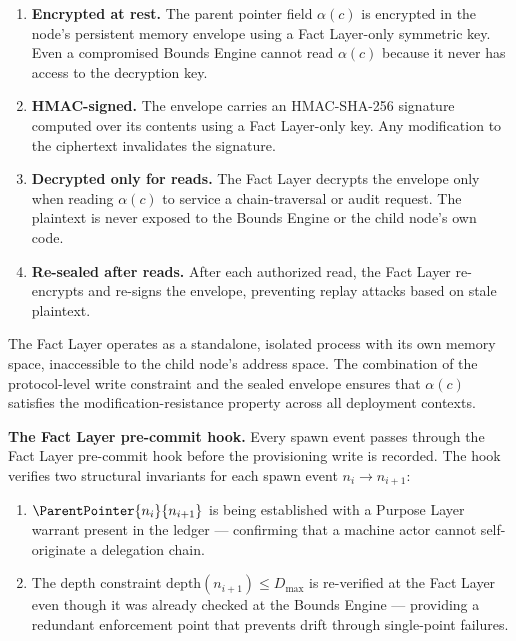 \begin{enumerate}
    \item \textbf{Encrypted at rest.} The parent pointer field $\alpha(c)$ is encrypted in the node's persistent memory envelope using a Fact Layer-only symmetric key. Even a compromised Bounds Engine cannot read $\alpha(c)$ because it never has access to the decryption key.

    \item \textbf{HMAC-signed.} The envelope carries an HMAC-SHA-256 signature computed over its contents using a Fact Layer-only key. Any modification to the ciphertext invalidates the signature.

    \item \textbf{Decrypted only for reads.} The Fact Layer decrypts the envelope only when reading $\alpha(c)$ to service a chain-traversal or audit request. The plaintext is never exposed to the Bounds Engine or the child node's own code.

    \item \textbf{Re-sealed after reads.} After each authorized read, the Fact Layer re-encrypts and re-signs the envelope, preventing replay attacks based on stale plaintext.
\end{enumerate}

The Fact Layer operates as a standalone, isolated process with its own memory space, inaccessible to the child node's address space. The combination of the protocol-level write constraint and the sealed envelope ensures that $\alpha(c)$ satisfies the modification-resistance property across all deployment contexts.

\medskip
\noindent\textbf{The Fact Layer pre-commit hook.} Every spawn event passes through the Fact Layer pre-commit hook before the provisioning write is recorded. The hook verifies two structural invariants for each spawn event $n_i \to n_{i+1}$:

\begin{enumerate}
    \item[(FC1)] $\ParentPointer{n_i}{n_{i+1}}$ is being established with a Purpose Layer warrant present in the ledger — confirming that a machine actor cannot self-originate a delegation chain.

    \item[(FC2)] The depth constraint $\text{depth}(n_{i+1}) \leq D_{\max}$ is re-verified at the Fact Layer even though it was already checked at the Bounds Engine — providing a redundant enforcement point that prevents drift through single-point failures.
\end{enumerate}

